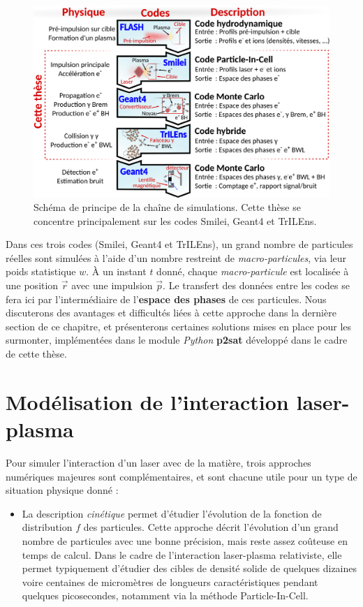 \begin{refsection}
\begin{figure}[hbtp]
	\centering
	\includegraphics[width=\linewidth]{4-simulation/numerical_setup.png}
	\caption{Schéma de principe de la chaîne de simulations. Cette thèse se concentre principalement sur les codes Smilei, Geant4 et TrILEns.}
	\label{fig:4-principe_chaine_simu}
\end{figure}

\newpage

Dans ces trois codes (Smilei, Geant4 et TrILEns), un grand nombre de particules réelles sont simulées à l'aide d'un nombre restreint de \textit{macro-particules}, via leur poids statistique $w$. À un instant $t$ donné, chaque \textit{macro-particule} est localisée à une position $\vec{r}$ avec une impulsion $\vec{p}$. Le transfert des données entre les codes se fera ici par l'intermédiaire de l'\textbf{espace des phases} de ces particules. Nous discuterons des avantages et difficultés liées à cette approche dans la dernière section de ce chapitre, et présenterons certaines solutions mises en place pour les surmonter, implémentées dans le module \textit{Python} \textbf{p2sat} \parencite{p2sat} développé dans le cadre de cette thèse.

\section{Modélisation de l'interaction laser-plasma}

Pour simuler l'interaction d'un laser avec de la matière, trois approches numériques majeures sont complémentaires, et sont chacune utile pour un type de situation physique donné \parencite{moreau_phd, gibbon_2013} :

\begin{itemize}
    \item La description \textit{cinétique} permet d'étudier l'évolution de la fonction de distribution $f$ des particules. Cette approche décrit l'évolution d'un grand nombre de particules avec une bonne précision, mais reste assez coûteuse en temps de calcul. Dans le cadre de l'interaction laser-plasma relativiste, elle permet typiquement d'étudier des cibles de densité solide de quelques dizaines voire centaines de micromètres de longueurs caractéristiques pendant quelques picosecondes, notamment via la méthode Particle-In-Cell.
    

\end{itemize}
\end{refsection}
